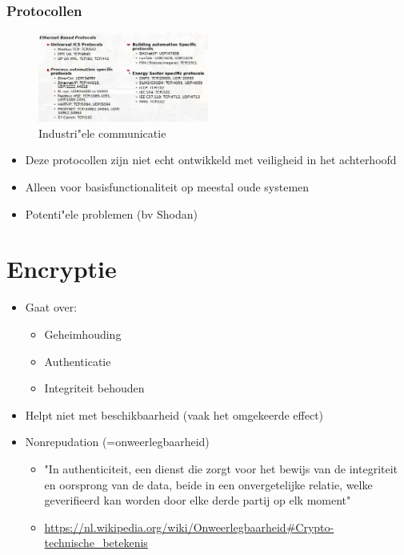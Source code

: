 \documentclass{article}
\begin{document}
\subsubsection{Protocollen}

\begin{figure}[H]
    \centering
    \includegraphics[width=0.5\textwidth]{iot-ics-protocollen.png}
    \caption{Industri"ele communicatie}
\end{figure}

\begin{itemize}
    \item Deze protocollen zijn niet echt ontwikkeld met veiligheid in het achterhoofd
    \item Alleen voor basisfunctionaliteit op meestal oude systemen
    \item Potenti"ele problemen (bv Shodan)
\end{itemize}

\section{Encryptie}

\begin{itemize}
    \item Gaat over:
    \begin{itemize}
        \item Geheimhouding
        \item Authenticatie
        \item Integriteit behouden
    \end{itemize}
    \item Helpt niet met beschikbaarheid (vaak het omgekeerde effect)
    \item Nonrepudation (=onweerlegbaarheid)
    \begin{itemize}
        \item "In authenticiteit, een dienst die zorgt voor het bewijs van de integriteit en oorsprong van de data, beide in een onvergetelijke relatie, welke geverifieerd kan worden door elke derde partij op elk moment"
        \item \url{https://nl.wikipedia.org/wiki/Onweerlegbaarheid#Crypto-technische\_betekenis}
    \end{itemize}
\end{itemize}
\end{document}
